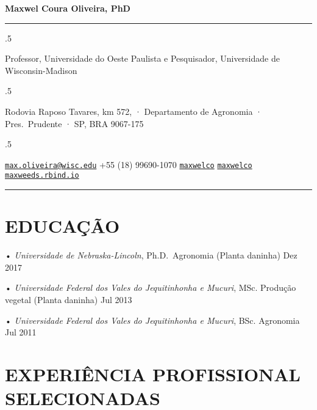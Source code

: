 \documentclass[11pt,]{article}
\begin{document}
\centerline{\huge \bf Maxwel Coura Oliveira, PhD}

\vspace{2 mm}

\hrule

\vspace{2 mm}

\moveleft.5\hoffset\centerline{Professor, Universidade do Oeste Paulista e Pesquisador, Universidade de
Wisconsin-Madison}
\moveleft.5\hoffset\centerline{Rodovia Raposo Tavares, km 572, · Departamento de Agronomia ·
Pres.~Prudente · SP, BRA 9067-175}
\moveleft.5\hoffset\centerline{ \faEnvelopeO \hspace{1 mm} \href{mailto:}{\tt \href{mailto:max.oliveira@wisc.edu}{\nolinkurl{max.oliveira@wisc.edu}}} \hspace{1 mm}  \faPhone \hspace{1 mm}  +55 (18) 99690-1070  \hspace{1 mm}  \faGithub \hspace{1 mm} \href{http://github.com/maxwelco}{\tt maxwelco} \hspace{1 mm}   \faTwitter \hspace{1 mm} \href{https:/twitter.com/maxwelco}{\tt maxwelco} \hspace{1 mm}  \faGlobe \hspace{1 mm} \href{http://maxweeds.rbind.io}{\tt maxweeds.rbind.io}   }

\vspace{2 mm}

\hrule


\hypertarget{educauxe7uxe3o}{%
\section{EDUCAÇÃO}\label{educauxe7uxe3o}}

• \emph{Universidade de Nebraska-Lincoln}, Ph.D.~Agronomia (Planta
daninha) \hfill Dez 2017

• \emph{Universidade Federal dos Vales do Jequitinhonha e Mucuri}, MSc.
Produção vegetal (Planta daninha) \hfill Jul 2013

• \emph{Universidade Federal dos Vales do Jequitinhonha e Mucuri}, BSc.
Agronomia \hfill Jul 2011

\hypertarget{experiuxeancia-profissional-selecionadas}{%
\section{EXPERIÊNCIA PROFISSIONAL
SELECIONADAS}\label{experiuxeancia-profissional-selecionadas}}
\end{document}
